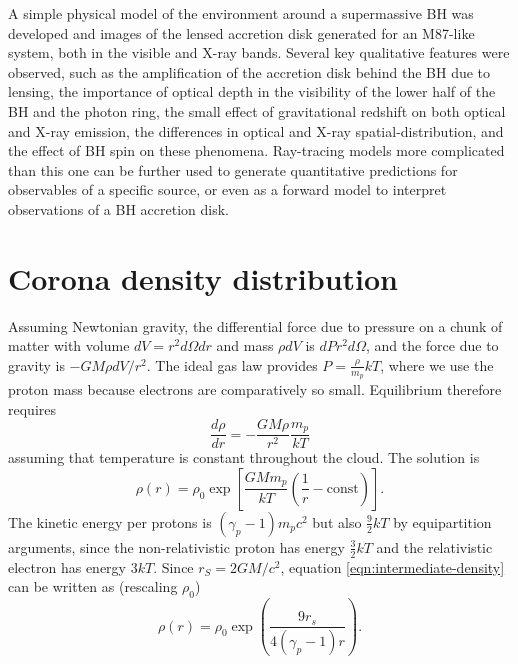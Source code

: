 \documentclass[twocolumn,twocolappendix]{aastex631}
\newcommand{\parens}[1]{\left(#1\right)}
\newcommand{\brackets}[1]{\left[#1\right]}
\begin{document}
A simple physical model of the environment around a supermassive BH was developed and images of the lensed accretion disk generated for an M87-like system, both in the visible and X-ray bands. Several key qualitative features were observed, such as the amplification of the accretion disk behind the BH due to lensing, the importance of optical depth in the visibility of the lower half of the BH and the photon ring, the small effect of gravitational redshift on both optical and X-ray emission, the differences in optical and X-ray spatial-distribution, and the effect of BH spin on these phenomena. Ray-tracing models more complicated than this one can be further used to generate quantitative predictions for observables of a specific source, or even as a forward model to interpret observations of a BH accretion disk.

{}


\appendix 

\section{Corona density distribution}
\label{app:corona-density}
Assuming Newtonian gravity, the differential force due to pressure on a chunk of matter with volume $dV = r^2 d\Omega dr$ and mass $\rho dV$ is $dP r^2 d\Omega$, and the force due to gravity is $-GM\rho dV / r^2$. The ideal gas law provides $P = \frac{\rho}{m_p}kT$, where we use the proton mass because electrons are comparatively so small. Equilibrium therefore requires
\begin{equation}
  \frac{d\rho}{dr} = -\frac{GM\rho}{r^2}\frac{m_p}{kT}
\end{equation}
assuming that temperature is constant throughout the cloud. The solution is
\begin{equation}
  \rho(r) = \rho_0 \exp \brackets{\frac{GMm_p}{kT}\parens{\frac{1}{r}-\text{const}}}.
  \label{eqn:intermediate-density}
\end{equation}
The kinetic energy per protons is $(\gamma_p-1) m_p c^2$ but also $\frac{9}{2}kT$ by equipartition arguments, since the non-relativistic proton has energy $\frac{3}{2}kT$ and the relativistic electron has energy $3kT$. Since $r_S = 2GM/c^2$, equation \ref{eqn:intermediate-density} can be written as (rescaling $\rho_0$)
\begin{equation}
  \rho(r) = \rho_0 \exp \parens{\frac{9r_s}{4(\gamma_p-1) r}}.
  \label{eqn:density-distro-full}
\end{equation}
\end{document}
